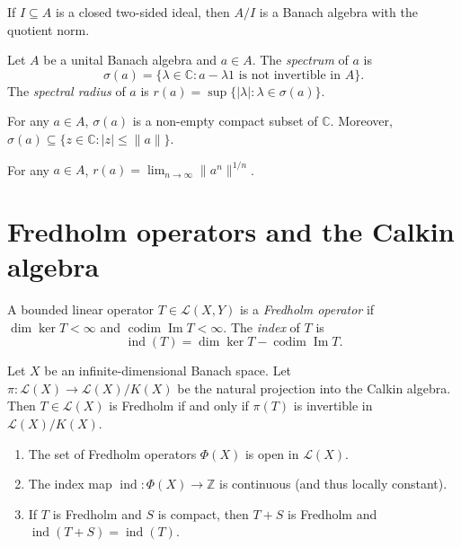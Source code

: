 \begin{proposition}
\label{proposition-algebra-quotient}
If $I \subseteq A$ is a closed two-sided
ideal, then $A/I$ is a Banach algebra with
the quotient norm.
\end{proposition}

\begin{definition}
\label{definition-spectrum-algebra}
Let $A$ be a unital Banach algebra and $a \in
A$. The {\it spectrum} of $a$ is
$$
\sigma(a) = \{ \lambda \in \mathbb{C} : a -
\lambda 1 \text{ is not invertible in } A \}.
$$
The {\it spectral radius} of $a$ is $r(a) =
\sup \{ |\lambda| : \lambda \in \sigma(a)
\}$.
\end{definition}

\begin{theorem}[Gelfand]
\label{theorem-spectrum-nonempty}
For any $a \in A$, $\sigma(a)$ is a non-empty
compact subset of $\mathbb{C}$. Moreover,
$\sigma(a) \subseteq \{ z \in \mathbb{C} :
|z| \leq \|a\| \}$.
\end{theorem}

\begin{theorem}
\label{theorem-spectral-radius-formula}
For any $a \in A$, $r(a) = \lim_{n \to
\infty} \|a^n\|^{1/n}$.
\end{theorem}

\section
{Fredholm operators and the Calkin algebra}
\label{section-fredholm-theory}

\begin{definition}
\label{definition-fredholm-operator-duplicate-2}
A bounded linear operator $T \in
\mathcal{L}(X, Y)$ is a {\it Fredholm
operator} if $\dim \ker T < \infty$ and
$\operatorname{codim} \operatorname{Im} T <
\infty$. The {\it index} of $T$ is
$$
\operatorname{ind}(T) = \dim \ker T -
\operatorname{codim} \operatorname{Im} T.
$$
\end{definition}

\begin{theorem}[Atkinson]
\label{theorem-atkinson-calkin}
Let $X$ be an infinite-dimensional Banach
space. Let $\pi : \mathcal{L}(X) \to
\mathcal{L}(X)/K(X)$ be the natural
projection into the Calkin algebra. Then $T
\in \mathcal{L}(X)$ is Fredholm if and only
if $\pi(T)$ is invertible in
$\mathcal{L}(X)/K(X)$.
\end{theorem}

\begin{proposition}
\label{proposition-index-stability}
\begin{enumerate}
\item The set of Fredholm operators $\Phi(X)$
is open in $\mathcal{L}(X)$.
\item The index map $\operatorname{ind} :
\Phi(X) \to \mathbb{Z}$ is continuous (and
thus locally constant).
\item If $T$ is Fredholm and $S$ is compact,
then $T+S$ is Fredholm and
$\operatorname{ind}(T+S) =
\operatorname{ind}(T)$.
\end{enumerate}
\end{proposition}

